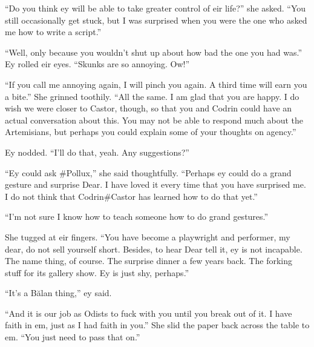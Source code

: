 ``Do you think ey will be able to take greater control of eir life?'' she asked. ``You still occasionally get stuck, but I was surprised when you were the one who asked me how to write a script.''

``Well, only because you wouldn't shut up about how bad the one you had was.'' Ey rolled eir eyes. ``Skunks are so annoying. Ow!''

``If you call me annoying again, I will pinch you again. A third time will earn you a bite.'' She grinned toothily. ``All the same. I am glad that you are happy. I do wish we were closer to Castor, though, so that you and Codrin could have an actual conversation about this. You may not be able to respond much about the Artemisians, but perhaps you could explain some of your thoughts on agency.''

Ey nodded. ``I'll do that, yeah. Any suggestions?''

``Ey could ask \#Pollux,'' she said thoughtfully. ``Perhaps ey could do a grand gesture and surprise Dear. I have loved it every time that you have surprised me. I do not think that Codrin\#Castor has learned how to do that yet.''

``I'm not sure I know how to teach someone how to do grand gestures.''

She tugged at eir fingers. ``You have become a playwright and performer, my dear, do not sell yourself short. Besides, to hear Dear tell it, ey is not incapable. The name thing, of course. The surprise dinner a few years back. The forking stuff for its gallery show. Ey is just shy, perhaps.''

``It's a Bălan thing,'' ey said.

``And it is our job as Odists to fuck with you until you break out of it. I have faith in em, just as I had faith in you.'' She slid the paper back across the table to em. ``You just need to pass that on.''
